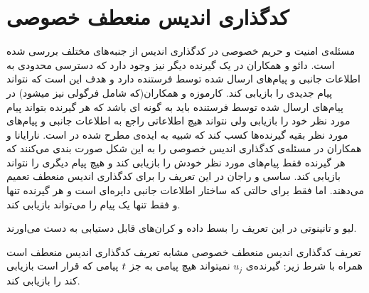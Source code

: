 \section{کدگذاری اندیس منعطف خصوصی}
\label{sec:privatepliable}
مسئله‌ی امنیت و حریم خصوصی در کدگذاری اندیس از جنبه‌های مختلف بررسی شده است. دائو و همکاران در
\cite{6166891}
یک گیرنده دیگر نیز وجود دارد که دسترسی محدودی به اطلاعات جانبی و پیام‌های ارسال شده توسط فرستنده دارد و هدف این است که نتواند پیام جدیدی را بازیابی کند. کارموزه و همکاران(که شامل فرگولی نیز میشود) در
\cite{8006988}
پیام‌های ارسال شده توسط فرستنده باید به گونه ای باشد که هر گیرنده بتواند پیام مورد نظر خود را بازیابی ولی نتواند هیچ اطلاعاتی راجع به اطلاعات جانبی و پیام‌های مورد نظر بقیه گیرنده‌ها کسب کند که شبیه به ایده‌ی
	مطرح شده در
\cite{7889028}
است.
نارایانا و همکاران در
\cite{9627083}
مسئله‌ی کدگذاری اندیس خصوصی را به این شکل صورت بندی می‌کنند که هر گیرنده فقط پیام‌های مورد نظر خودش را بازیابی کند و هیچ پیام دیگری را نتواند بازیابی کند. ساسی و راجان در
\cite{sasi2019pliable}
این تعریف را برای کدگذاری اندیس منعطف تعمیم می‌دهند. اما فقط برای حالتی که ساختار اطلاعات جانبی دایره‌ای است و هر گیرنده تنها و فقط تنها یک پیام را می‌تواند بازیابی کند.

لیو و تانینوتی در 
\cite{8989161}
این تعریف را بسط داده و کران‌های قابل دستیابی به دست می‌اورند.

تعریف کدگذاری اندیس منعطف خصوصی مشابه تعریف کدگذاری اندیس منعطف است همراه با شرط زیر:
گیرنده‌ی
$u_j$
نمیتواند هیچ پیامی به جز
 $t$ 
 پیامی که قرار است بازیابی کند را بازیابی کند.